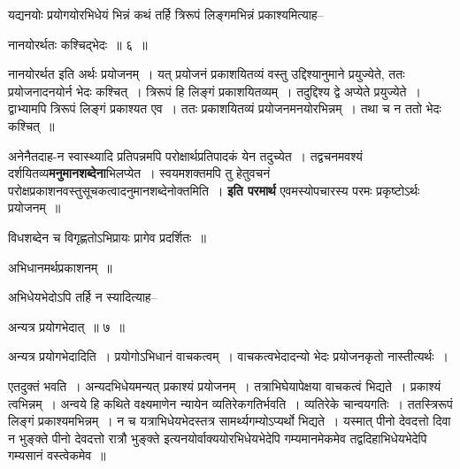 \documentclass[article,12pt,a4paper]{memoir}
\begin{document}
	  \pstart यद्यनयोः प्रयोगयोरभिधेयं भिन्नं कथं तर्हि त्रिरूपं लिङ्गमभिन्नं प्रकाश्यमित्याह--
	\pend
        
	  \bigskip
	  \begingroup
	

	  \pstart नानयोरर्थतः कश्चिद्भेदः ॥ ६ ॥
	\pend
      
	  \endgroup
	 

	  \pstart नानयोरर्थत इति अर्थः प्रयोजनम् । यत् प्रयोजनं प्रकाशयितव्यं वस्तु उद्दिश्यानुमाने प्रयुज्येते, ततः प्रयोजनादनयोर्न भेदः कश्चित् । त्रिरूपं हि लिङ्गं प्रकाशयितव्यम् । तदुद्दिश्य द्वे अप्येते प्रयुज्येते । द्वाभ्यामपि त्रिरूपं लिङ्गं प्रकाश्यत एव । ततः प्रकाशयितव्यं प्रयोजनमनयोरभिन्नम् । तथा च न ततो भेदः कश्चित् ॥
	\pend
      
	  \endgroup
	

	  \pstart अनेनैतदाह-न स्वास्थ्यादि प्रतिपन्नमपि परोक्षार्थप्रतिपादकं येन तदुच्येत । तद्वचनमवश्यं दर्शयितव्य\textbf{मनुमानशब्देना}भिलप्येत । स्वयमशक्तमपि तु हेतुवचनं परोक्षप्रकाशनवस्तुसूचकत्वादनुमानशब्देनोक्तमिति । \textbf{इति परमार्थ} एवमस्योपचारस्य परमः प्रकृष्टोऽर्थः प्रयोजनम् ॥
	\pend
      

	  \pstart विधशब्देन च विगृह्णतोऽभिप्रायः प्रागेव प्रदर्शितः ॥
	\pend
      

	  \pstart अभिधानमर्थप्रकाशनम् ॥
	\pend
	  \bigskip
	  \begingroup
	

	  \pstart अभिधेयभेदोऽपि तर्हि न स्यादित्याह--
	\pend
        
	  \bigskip
	  \begingroup
	

	  \pstart अन्यत्र प्रयोगभेदात् ॥ ७ ॥
	\pend
      
	  \endgroup
	 

	  \pstart अन्यत्र प्रयोगभेदादिति । प्रयोगोऽभिधानं वाचकत्वम् । वाचकत्वभेदादन्यो भेदः प्रयोजनकृतो नास्तीत्यर्थः ।
	\pend
        

	  \pstart एतदुक्तं भवति । अन्यदभिधेयमन्यत् प्रकाश्यं प्रयोजनम् । तत्राभिघेयापेक्षया वाचकत्वं भिद्यते । प्रकाश्यं त्वभिन्नम् । अन्वये हि कथिते वक्ष्यमाणेन न्यायेन व्यतिरेकगतिर्भवति । व्यतिरेके चान्वयगतिः । ततस्त्रिरूपं लिङ्गं प्रकाश्यमभिन्नम् । न च यत्राभिधेयभेदस्तत्र सामर्थ्यगम्योऽप्यर्थो भिद्यते । यस्मात् पीनो देवदत्तो दिवा न भुङ्क्ते पीनो देवदत्तो रात्रौ भुङ्क्ते इत्यनयोर्वाक्ययोरभिधेयभेदेपि गम्यमानमेकमेव तद्वदिहाभिधेयभेदेपि गम्यसानं वस्त्वेकमेव ॥
	\pend
      
\end{document}

